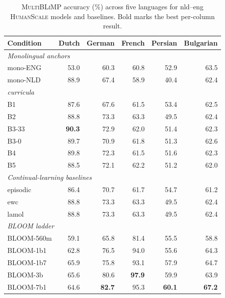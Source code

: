 \begin{table}[!ht]
  \centering
  \small
  \caption{\textsc{MultiBLiMP} accuracy (\%) across five languages for nld--eng \textsc{HumanScale} \beetle{} models and baselines. Bold marks the best per-column result.}
  \label{tab:multiblimp}
  \begin{tabular}{lrrrrr}
    \toprule
    Condition & Dutch & German & French & Persian & Bulgarian \\
    \midrule
    \multicolumn{6}{l}{\emph{Monolingual anchors}} \\
    mono-ENG & 53.0 & 60.3 & 60.8 & 52.9 & 63.5 \\
    mono-NLD & 88.9 & 67.4 & 58.9 & 40.4 & 62.4 \\
    \midrule
    \multicolumn{6}{l}{\emph{\beetle{} curricula}} \\
    B1       & 87.6 & 67.6 & 61.5 & 53.4 & 62.5 \\
    B2       & 88.8 & 73.3 & 63.3 & 49.5 & 62.4 \\
    B3-33    & \textbf{90.3} & 72.9 & 62.0 & 51.4 & 62.3 \\
    B3-0     & 89.7 & 70.9 & 61.8 & 51.3 & 62.6 \\
    B4       & 89.8 & 72.3 & 61.5 & 51.6 & 62.3 \\
    B5       & 88.5 & 72.1 & 62.2 & 51.2 & 62.0 \\
    \midrule
    \multicolumn{6}{l}{\emph{Continual-learning baselines}} \\
    episodic & 86.4 & 70.7 & 61.7 & 54.7 & 61.2 \\
    ewc      & 88.8 & 73.3 & 63.3 & 49.5 & 62.4 \\
    lamol    & 88.8 & 73.3 & 63.3 & 49.5 & 62.4 \\
    \midrule
    \multicolumn{6}{l}{\emph{BLOOM ladder}} \\
    BLOOM-560m & 59.1 & 65.8 & 81.4 & 55.5 & 58.8 \\
    BLOOM-1b1  & 62.8 & 76.5 & 94.0 & 55.6 & 64.3 \\
    BLOOM-1b7  & 65.9 & 75.8 & 93.1 & 57.9 & 64.7 \\
    BLOOM-3b   & 65.6 & 80.6 & \textbf{97.9} & 59.9 & 63.9 \\
    BLOOM-7b1  & 64.6 & \textbf{82.7} & 95.3 & \textbf{60.1} & \textbf{67.2} \\
    \bottomrule
  \end{tabular}
\end{table}

